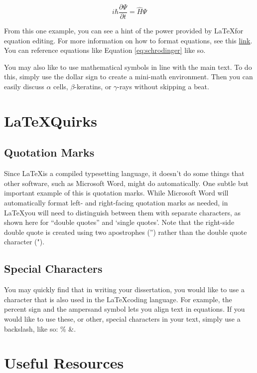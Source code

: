 \begin{equation}
    i \hbar \frac{\partial \Psi }{\partial t} = \hat{H} \Psi
    \label{eq:schrodinger}
\end{equation}

From this one example, you can see a hint of the power provided by \LaTeX for equation editing. For more information on how to format equations, see this \href{https://en.wikibooks.org/wiki/LaTeX/Mathematics}{link}. You can reference equations like Equation \eqref{eq:schrodinger} like so. 

You may also like to use mathematical symbols in line with the main text. To do this, simply use the dollar sign to create a mini-math environment. Then you can easily discuss $\alpha$ cells, $\beta$-keratins, or $\gamma$-rays without skipping a beat.

\section{\LaTeX Quirks}

\subsection{Quotation Marks}

Since \LaTeX is a compiled typesetting language, it doesn't do some things that other software, such as Microsoft Word, might do automatically. One subtle but important example of this is quotation marks. While Microsoft Word will automatically format left- and right-facing quotation marks as needed, in \LaTeX you will need to distinguish between them with separate characters, as shown here for ``double quotes'' and `single quotes'. Note that the right-side double quote is created using two apostrophes ('') rather than the double quote character ("). 

\subsection{Special Characters}

You may quickly find that in writing your dissertation, you would like to use a character that is also used in the \LaTeX coding language. For example, the percent sign %
and the ampersand symbol lets you align text in equations. If you would like to use these, or other, special characters in your text, simply use a backslash, like so: \% \&. 

\section{Useful Resources}

